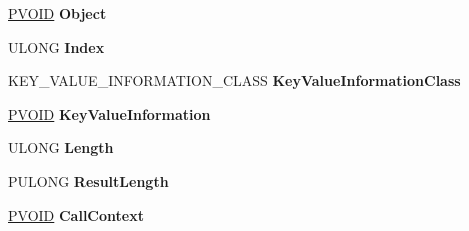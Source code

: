 \begin{DoxyCompactItemize}
\item 
\mbox{\label{struct___r_e_g___e_n_u_m_e_r_a_t_e___v_a_l_u_e___k_e_y___i_n_f_o_r_m_a_t_i_o_n_ae4db6b1a95024fd05e02797014c5e7b8}} 
\hyperlink{interfacevoid}{P\+V\+O\+ID} {\bfseries Object}
\item 
\mbox{\label{struct___r_e_g___e_n_u_m_e_r_a_t_e___v_a_l_u_e___k_e_y___i_n_f_o_r_m_a_t_i_o_n_ad1e6e561f3ce6f8e5379beaf25f0a212}} 
U\+L\+O\+NG {\bfseries Index}
\item 
\mbox{\label{struct___r_e_g___e_n_u_m_e_r_a_t_e___v_a_l_u_e___k_e_y___i_n_f_o_r_m_a_t_i_o_n_a542eea926326043d3461351b61dd7623}} 
K\+E\+Y\+\_\+\+V\+A\+L\+U\+E\+\_\+\+I\+N\+F\+O\+R\+M\+A\+T\+I\+O\+N\+\_\+\+C\+L\+A\+SS {\bfseries Key\+Value\+Information\+Class}
\item 
\mbox{\label{struct___r_e_g___e_n_u_m_e_r_a_t_e___v_a_l_u_e___k_e_y___i_n_f_o_r_m_a_t_i_o_n_a93cac2f50ec8d204b920b907e2943a84}} 
\hyperlink{interfacevoid}{P\+V\+O\+ID} {\bfseries Key\+Value\+Information}
\item 
\mbox{\label{struct___r_e_g___e_n_u_m_e_r_a_t_e___v_a_l_u_e___k_e_y___i_n_f_o_r_m_a_t_i_o_n_a3dabdb23be05cf4d7323c05286dfb3a8}} 
U\+L\+O\+NG {\bfseries Length}
\item 
\mbox{\label{struct___r_e_g___e_n_u_m_e_r_a_t_e___v_a_l_u_e___k_e_y___i_n_f_o_r_m_a_t_i_o_n_a08a6d7550621ff1f6cee456380b4b090}} 
P\+U\+L\+O\+NG {\bfseries Result\+Length}
\item 
\mbox{\label{struct___r_e_g___e_n_u_m_e_r_a_t_e___v_a_l_u_e___k_e_y___i_n_f_o_r_m_a_t_i_o_n_a89ba59e188d2d84eec5625557cd8bdd6}} 
\hyperlink{interfacevoid}{P\+V\+O\+ID} {\bfseries Call\+Context}

\end{DoxyCompactItemize}
